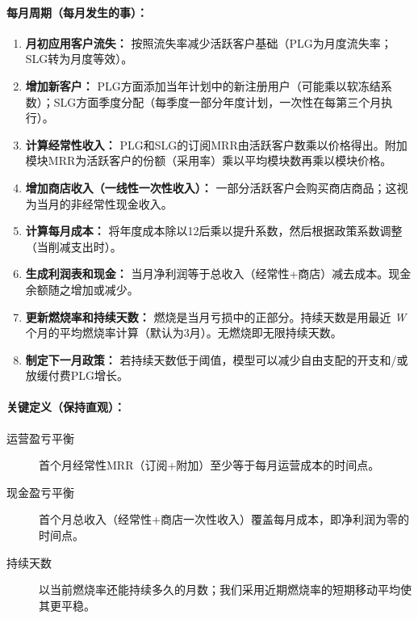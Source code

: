 \documentclass[11点, A4纸, 单面]{article}
\begin{document}
\paragraph{每月周期（每月发生的事）：}
\begin{enumerate}
\item \textbf{月初应用客户流失：} 按照流失率减少活跃客户基础（PLG为月度流失率；SLG转为月度等效）。
\item \textbf{增加新客户：} PLG方面添加当年计划中的新注册用户（可能乘以软冻结系数）；SLG方面季度分配（每季度一部分年度计划，一次性在每第三个月执行）。
\item \textbf{计算经常性收入：} PLG和SLG的订阅MRR由活跃客户数乘以价格得出。附加模块MRR为活跃客户的份额（采用率）乘以平均模块数再乘以模块价格。
\item \textbf{增加商店收入（一线性一次性收入）：} 一部分活跃客户会购买商店商品；这视为当月的非经常性现金收入。
\item \textbf{计算每月成本：} 将年度成本除以12后乘以提升系数，然后根据政策系数调整（当削减支出时）。
\item \textbf{生成利润表和现金：} 当月净利润等于总收入（经常性+商店）减去成本。现金余额随之增加或减少。
\item \textbf{更新燃烧率和持续天数：} 燃烧是当月亏损中的正部分。持续天数是用最近 \emph{W} 个月的平均燃烧率计算（默认为3月）。无燃烧即无限持续天数。
\item \textbf{制定下一月政策：} 若持续天数低于阈值，模型可以减少自由支配的开支和/或放缓付费PLG增长。
\end{enumerate}


\paragraph{关键定义（保持直观）：}
\begin{description}
\item[运营盈亏平衡] 首个月经常性MRR（订阅+附加）至少等于每月运营成本的时间点。
\item[现金盈亏平衡] 首个月总收入（经常性+商店一次性收入）覆盖每月成本，即净利润为零的时间点。
\item[持续天数] 以当前燃烧率还能持续多久的月数；我们采用近期燃烧率的短期移动平均使其更平稳。
\end{description}
\end{document}
